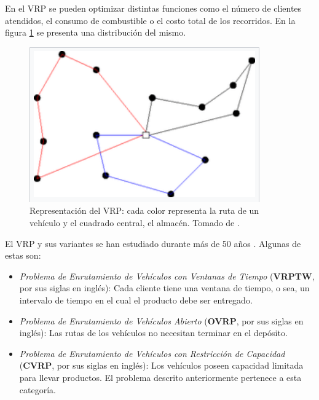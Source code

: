 \documentclass[a4paper,10pt,twocolumn]{article}
\begin{document}
	En el VRP se pueden optimizar distintas funciones como el número de clientes 
	atendidos, el consumo de combustible o el costo total de los recorridos. En la figura 
	\ref{fig:vrp} se presenta una distribución del mismo.

	\begin{figure}[htb]%
		\begin{center}
			\includegraphics[scale=.45]{Graphics/vrp.png}
		\end{center}
		
		\caption{Representación del VRP: cada color representa la ruta de un vehículo y
		el cuadrado central, el almacén. Tomado de \cite{wiki}.\label{fig:vrp}}%
	\end{figure}

	El VRP y sus variantes se han estudiado durante más de 50 años \cite{Dantzig}.
	Algunas de estas son:

	\begin{itemize}
		\item \textit{Problema de Enrutamiento de Vehículos con Ventanas de Tiempo} 
			  (\textbf{VRPTW}, por sus siglas en inglés): Cada cliente tiene una ventana
			  de tiempo, o sea, un intervalo de tiempo en el cual el producto debe ser 
			  entregado.
	
		\item \textit{Problema de Enrutamiento de Vehículos Abierto} (\textbf{OVRP}, por
			  sus siglas en inglés): Las rutas de los vehículos no necesitan terminar en
			  el depósito.
	
		\item \textit{Problema de Enrutamiento de Vehículos con Res\-tric\-ción de Capacidad} 
			  (\textbf{CVRP}, por sus siglas en inglés): Los vehículos poseen capacidad 
			  limitada para llevar productos. El problema descrito anteriormente pertenece
			  a esta categoría.
	\end{itemize}
\end{document}

